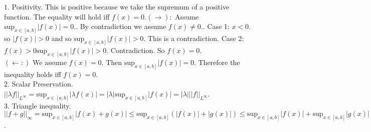\documentclass[letterpaper,12pt]{article}
\theoremstyle{definition}
\begin{document}
 $ 1.$ Positivity.  This is positive because we take the supremum of a positive function.  The equality will hold iff $f(x) = 0. (\rightarrow):$ Assume $\mathrm{sup}_{ x \in [a, b]} |f(x)| = 0.$. By contradiction we assume $f(x) \neq 0. $.  Case 1: $x<0.$ so $|f(x)| > 0$ and so $\mathrm{sup}_{x \in [a, b]}|f(x)| > 0$.  This is a contradiction.  Case 2: $f(x) > 0 \mathrm{sup}_{x \in [a, b]} |f(x)| > 0$. Contradiction.  So $f(x) = 0$.  \\
 $(\leftarrow:)$  We assume $f(x) = 0$.  Then $\mathrm{sup}_{x \in [a, b]}|f(x)| = 0$.  Therefore the inequality holds iff $f(x) = 0$.\\
 2. Scalar Preservation.  $||\lambda f||_{L^{\infty}} = \mathrm{sup}_{x \in [a, b]} |\lambda f(x)| = |\lambda| \mathrm{sup}_{x \in [a, b]} |f(x)| = |\lambda|||f||_{L^{\infty}}$.\\
3. Triangle inequality.  $||f + g||_{\infty} = \mathrm{sup}_{x \in [a, b]}|f(x) + g(x)| \leq \mathrm{sup}_{ x \in [a, b]} (|f(x)| + |g(x)|) \leq \mathrm{sup}_{x \in [a, b]}|f(x)| + \mathrm{sup}_{x \in [a, b]}|g(x)| = ||f||_{\infty} + ||g||_{\infty}$.\\

 \vspace{5mm}
\end{document}
